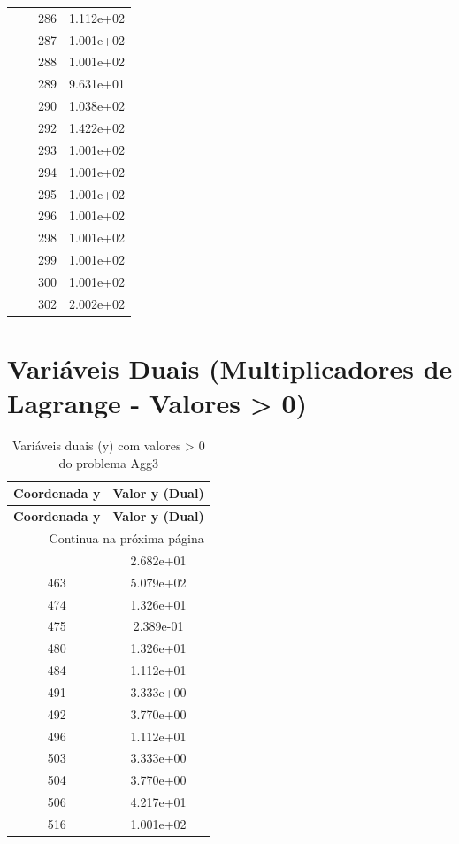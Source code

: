 \documentclass[12pt]{article}
\begin{document}
\begin{longtable}{@{}cccc@{}}
 &  & 286 & 1.112e+02 \\
 &  & 287 & 1.001e+02 \\
 &  & 288 & 1.001e+02 \\
 &  & 289 & 9.631e+01 \\
 &  & 290 & 1.038e+02 \\
 &  & 292 & 1.422e+02 \\
 &  & 293 & 1.001e+02 \\
 &  & 294 & 1.001e+02 \\
 &  & 295 & 1.001e+02 \\
 &  & 296 & 1.001e+02 \\
 &  & 298 & 1.001e+02 \\
 &  & 299 & 1.001e+02 \\
 &  & 300 & 1.001e+02 \\
 &  & 302 & 2.002e+02 \\

\bottomrule
\end{longtable}


\section{Variáveis Duais (Multiplicadores de Lagrange - Valores > 0)}

\begin{longtable}{@{}cc@{}}
\caption{Variáveis duais (y) com valores > 0 do problema Agg3} \\
\toprule
\textbf{Coordenada y} & \textbf{Valor y (Dual)} \\
\midrule
\endfirsthead

\toprule
\textbf{Coordenada y} & \textbf{Valor y (Dual)} \\
\midrule
\endhead

\midrule \multicolumn{2}{r}{{Continua na próxima página}} \\ \midrule
\endfoot

\bottomrule
\endlastfoot
457 & 2.682e+01 \\
463 & 5.079e+02 \\
474 & 1.326e+01 \\
475 & 2.389e-01 \\
480 & 1.326e+01 \\
484 & 1.112e+01 \\
491 & 3.333e+00 \\
492 & 3.770e+00 \\
496 & 1.112e+01 \\
503 & 3.333e+00 \\
504 & 3.770e+00 \\
506 & 4.217e+01 \\
516 & 1.001e+02 \\

\bottomrule
\end{longtable}
\end{document}
